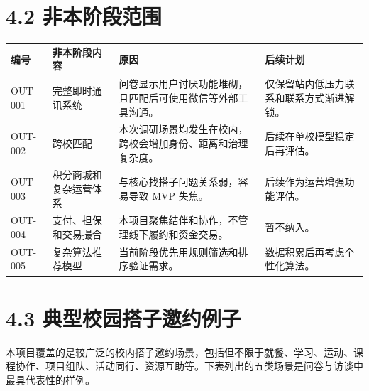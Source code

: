 \section{4.2
非本阶段范围}\label{ux975eux672cux9636ux6bb5ux8303ux56f4}

{\def\LTcaptype{none} %
\begin{xltabular}{\textwidth}{@{}>{\centering\arraybackslash}X>{\centering\arraybackslash}X>{\centering\arraybackslash}X>{\centering\arraybackslash}X@{}}
\toprule\noalign{}
\endhead
\bottomrule\noalign{}
\endlastfoot
\textbf{编号} & \textbf{非本阶段内容} & \textbf{原因} &
\textbf{后续计划} \\
OUT-001 & 完整即时通讯系统 &
问卷显示用户讨厌功能堆砌，且匹配后可使用微信等外部工具沟通。 &
仅保留站内低压力联系和联系方式渐进解锁。 \\
OUT-002 & 跨校匹配 &
本次调研场景均发生在校内，跨校会增加身份、距离和治理复杂度。 &
后续在单校模型稳定后再评估。 \\
OUT-003 & 积分商城和复杂运营体系 & 与核心找搭子问题关系弱，容易导致 MVP
失焦。 & 后续作为运营增强功能评估。 \\
OUT-004 & 支付、担保和交易撮合 &
本项目聚焦结伴和协作，不管理线下履约和资金交易。 & 暂不纳入。 \\
OUT-005 & 复杂算法推荐模型 & 当前阶段优先用规则筛选和排序验证需求。 &
数据积累后再考虑个性化算法。 \\
\end{xltabular}
}

\section{4.3
典型校园搭子邀约例子}\label{ux5178ux578bux6821ux56edux642dux5b50ux9080ux7ea6ux4f8bux5b50}

本项目覆盖的是较广泛的校内搭子邀约场景，包括但不限于就餐、学习、运动、课程协作、项目组队、活动同行、资源互助等。下表列出的五类场景是问卷与访谈中最具代表性的样例。


